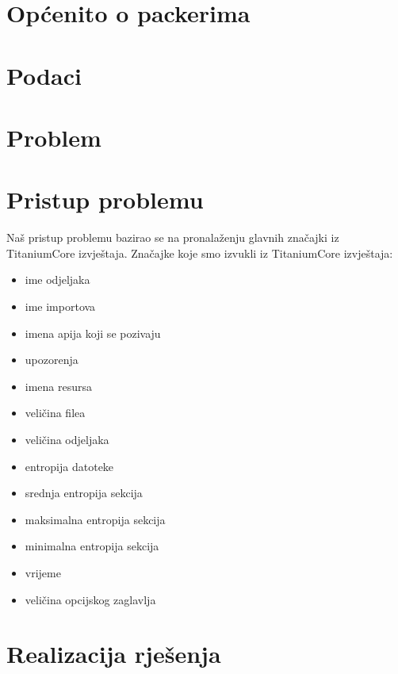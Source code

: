 \documentclass[conference]{IEEEtran}
\begin{document}
\section{Općenito o packerima}

\section{Podaci}

\section{Problem}

\section{Pristup problemu}
Naš pristup problemu bazirao se na pronalaženju glavnih značajki iz TitaniumCore izvještaja.
Značajke koje smo izvukli iz TitaniumCore izvještaja:
\begin{itemize}
\item  ime odjeljaka
\item	ime importova
\item 	imena apija koji se pozivaju
\item	upozorenja
\item 	imena resursa
\item	veličina filea
\item	veličina odjeljaka 
\item	entropija datoteke
\item 	srednja entropija sekcija
\item	maksimalna entropija sekcija
\item 	minimalna entropija sekcija
\item	vrijeme
\item	veličina opcijskog zaglavlja
\end{itemize}
\section{Realizacija rješenja}
\end{document}
